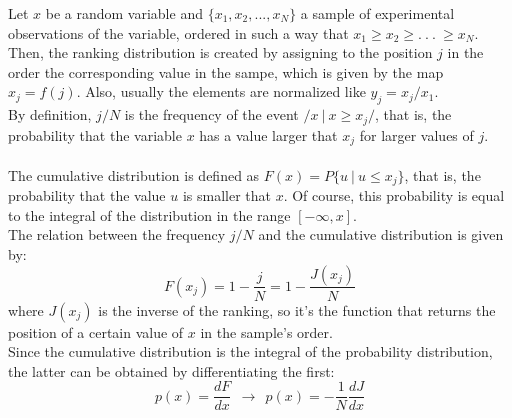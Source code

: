 Let $x$ be a random variable and $\{x_1,x_2, . . . , x_N\}$ a sample of experimental observations of the variable, ordered in such a way that $x_1 \geq x_2 \geq . \ . \ . \ \geq x_N$. \\ 
Then, the ranking distribution is created by assigning to the position $j$ in the order the corresponding value in the sampe, which is given by the map $x_j = f(j)$. Also, usually the elements are normalized like $y_j = x_j/x_1$. \\ 
By definition, $j/N$ is the frequency of the event $/{x \ | \ x \geq x_j /}$, that is, the probability that the variable $x$ has a value larger that $x_j$ for larger values of $j$. \\ \\
The cumulative distribution is defined as $F(x) = P\{u \ | \ u \leq x_j\}$, that is, the probability that the value $u$ is smaller that $x$. Of course, this probability is equal to the integral of the distribution in the range $[-\infty,x]$. \\
The relation between the frequency $j/N$ and the cumulative distribution is given by:
$$
	F(x_j) = 1 - \frac{j}{N} = 1 - \frac{J(x_j)}{N}
$$
where $J(x_j)$ is the inverse of the ranking, so it's the function that returns the position of a certain value of $x$ in the sample's order. \\
Since the cumulative distribution is the integral of the probability distribution, the latter can be obtained by differentiating the first:
$$
	p(x) = \frac{dF}{dx} \ \ \longrightarrow \ \ p(x) = -\frac{1}{N} \frac{dJ}{dx}
$$
